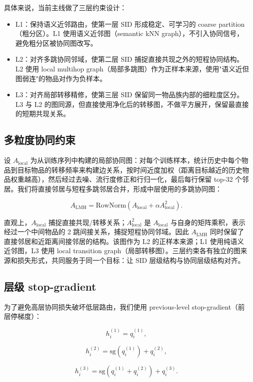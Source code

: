 \documentclass[11pt]{article}
\newcommand{\sg}{\mathrm{sg}}
\newcommand{\row}{\mathrm{RowNorm}}
\begin{document}
具体来说，当前主线做了三层约束设计：

\begin{itemize}
  \item L1：保持语义近邻路由，使第一层 SID 形成稳定、可学习的 coarse partition（粗分区）。L1 使用语义近邻图（semantic kNN graph），不引入协同信号，避免粗分区被协同图改写。
  \item L2：对齐多跳协同邻域，使第二层 SID 捕捉直接共现之外的短程协同结构。L2 使用 local multihop graph（局部多跳图）作为正样本来源，使用"语义近但图弱连"的物品对作为负样本。
  \item L3：对齐局部转移精修，使第三层 SID 保留同一物品族内部的细粒度区分。L3 与 L2 的图同源，但直接使用净化后的转移图，不做平方展开，保留最直接的短期共现关系。
\end{itemize}

\subsection{多粒度协同约束}

设 $A_{\mathrm{local}}$ 为从训练序列中构建的局部协同图：对每个训练样本，统计历史中每个物品到目标物品的转移频率来构建边关系，按时间近度加权（距离目标越近的历史物品权重越高），然后经过去噪、流行度修正和行归一化，最后每行保留 top-32 个邻居。我们将直接邻居与短程多跳邻居合并，形成中层使用的多跳协同图：

\[
A_{\mathrm{LMH}}
=
\row\left(A_{\mathrm{local}} + \alpha A_{\mathrm{local}}^2\right).
\]

直观上，$A_{\mathrm{local}}$ 捕捉直接共现/转移关系；$A_{\mathrm{local}}^2$ 是 $A_{\mathrm{local}}$ 与自身的矩阵乘积，表示经过一个中间物品的 2 跳间接关系，捕捉短程协同邻域。因此 $A_{\mathrm{LMH}}$ 同时保留了直接邻居和近距离间接邻居的结构。该图作为 L2 的正样本来源；L1 使用纯语义近邻图，L3 使用 local transition graph（局部转移图）。三层约束各有独立的图来源和损失形式，共同服务于同一个目标：让 SID 层级结构与协同层级结构对齐。

\subsection{层级 stop-gradient}

为了避免高层协同损失破坏低层路由，我们使用 previous-level stop-gradient（前层停梯度）：

\[
h_i^{(1)} = q_i^{(1)},
\]

\[
h_i^{(2)} = \sg(q_i^{(1)}) + q_i^{(2)},
\]

\[
h_i^{(3)} = \sg(q_i^{(1)}+q_i^{(2)}) + q_i^{(3)}.
\]
\end{document}
